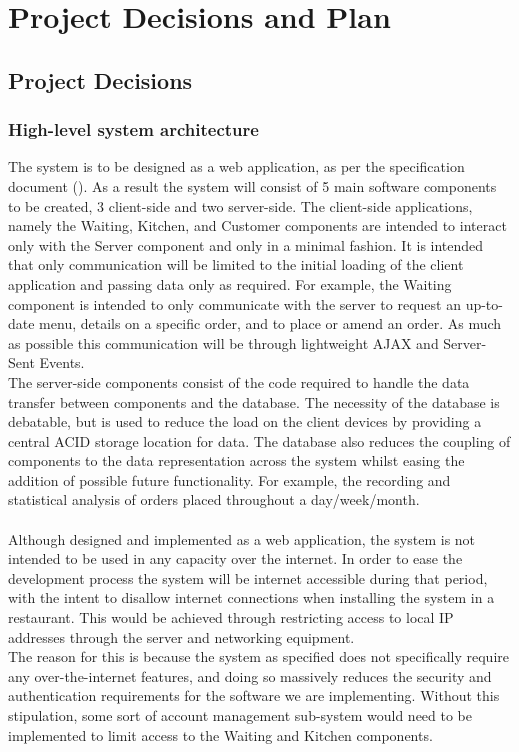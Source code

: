 \documentclass[11pt, a4paper]{report}
\begin{document}
\chapter{Project Decisions and Plan}

\tableofcontents
\pagebreak

\section{Project Decisions}\label{sec:Decisions}

\subsection{High-level system architecture}\label{subsec:architecture}

The system is to be designed as a web application, as per the specification document (\cite{Specification}). As a result the system will consist of 5 main software components to be created, 3 client-side and two server-side. The client-side applications, namely the Waiting, Kitchen, and Customer components are intended to interact only with the Server component and only in a minimal fashion.  It is intended that only communication will be limited to the initial loading of the client application and passing data only as required. For example, the Waiting component is intended to only communicate with the server to request an up-to-date menu, details on a specific order, and to place or amend an order. As much as possible this communication will be through lightweight AJAX and Server-Sent Events.\\
The server-side components consist of the code required to handle the data transfer between components and the database. The necessity of the database is debatable, but is used to reduce the load on the client devices by providing a central ACID storage location for data. The database also reduces the coupling of components to the data representation across the system whilst easing the addition of possible future functionality. For example, the recording and statistical analysis of orders placed throughout a day/week/month.\\
\\
Although designed and implemented as a web application, the system is not intended to be used in any capacity over the internet. In order to ease the development process the system will be internet accessible during that period, with the intent to disallow internet connections when installing the system in a restaurant. This would be achieved through restricting access to local IP addresses through the server and networking equipment.\\
The reason for this is because the system as specified does not specifically require any over-the-internet features, and doing so massively reduces the security and authentication requirements for the software we are implementing. Without this stipulation, some sort of account management sub-system would need to be implemented to limit access to the Waiting and Kitchen components.
\end{document}
